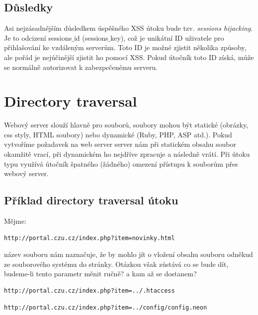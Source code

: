 \documentclass[12pt, a4paper]{report}
\begin{document}
\subsection{Důsledky}
Asi nejzásadnějším důsledkem úspěšného XSS útoku bude tzv. \textit{sessions hijacking}. Je to odcizení sessions$\_$id (sessions$\_$key), což je unikátní ID uživatele pro přihlašování ke vzdáleným serverům. Toto ID je možné zjistit několika způsoby, ale pořád je nejúčinější zjistit ho pomocí XSS. Pokud útočník toto ID získá, může se normálně autorizovat k zabezpečenému serveru.

\section{Directory traversal}
Webový server slouží hlavně pro  souborů, soubory mohou být statické (obrázky, css styly, HTML soubory) nebo dynamické (Ruby, PHP, ASP atd.). Pokud vytvoříme požadavek na web server server nám při statickém obsahu soubor okamžitě vrací, při dynamickém ho nejdříve zpracuje a následně vrátí. Při útoku typu  využívá útočník špatného (žádného) omezení přístupu k souborům přes webový server.

\subsection{Příklad directory traversal útoku}
Mějme:
\begin{lstlisting}[label=some-code,caption=URL adresa s podezdřením na include souboru]
http://portal.czu.cz/index.php?item=novinky.html
\end{lstlisting}

název souboru  nám naznačuje, že by mohlo jít o vložení obsahu souboru  odněkud ze souborového systému do stránky. Otázkou však zůstává co se bude dít, budeme-li tento parametr měnit ručně? a kam až se dostanem?

\begin{lstlisting}[label=man_url_get_htaccess,caption=Manipulace s URL - získání .htaccess]
http://portal.czu.cz/index.php?item=../.htaccess
\end{lstlisting}

\begin{lstlisting}[label=man_url_get_neon,caption=Manipulace s URL - získání config.neon]
http://portal.czu.cz/index.php?item=../config/config.neon
\end{lstlisting}
\end{document}
